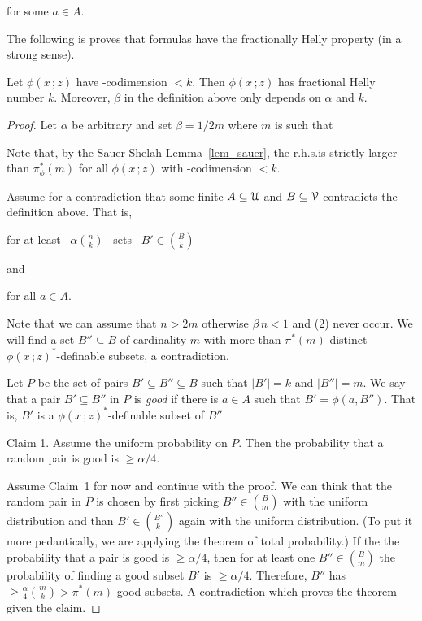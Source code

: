 \documentclass[scombinatorics.tex]{subfiles}
\begin{document}
\hfill for some $a\in A$.

The following is proves that \nip{} formulas have the fractionally Helly property (in a strong sense).

\begin{theorem}[(Matou\v{s}ek)]\label{thm_matousek}
Let  $\phi(x\,;z)$ have \vc-codimension $<k$.
Then $\phi(x\,;z)$ has fractional Helly number $k$.
Moreover, $\beta$ in the definition above only depends on $\alpha$ and $k$.
\end{theorem}

\begin{proof}
Let $\alpha$ be arbitrary and set $\beta=1/2m$ where $m$ is such that 


Note that, by the Sauer-Shelah Lemma~\ref{lem_sauer}, the r.h.s.\@ is strictly larger than $\pi^*_\phi(m)$ for all $\phi(x\,;z)$ with \vc-codimension $<k$.

Assume for a contradiction that some finite $A\subseteq\EuScript U$ and $B\subseteq\EuScript V$ contradicts the definition above.
That is,
 
\hfill for at least \ $\displaystyle\alpha{n\choose k}$ \ sets \ $\displaystyle B'\in{B\choose k}$

and

\hfill for all $a\in A$.

Note that we can assume that $n>2m$ otherwise $\beta\,n<1$ and (2) never occur.
We will find a set $B''\subseteq B$ of cardinality $m$ with more than $\pi^*(m)$ distinct $\phi(x\,;z)^*$-definable subsets, a contradiction.

Let $P$ be the set of pairs $B'\subseteq B''\subseteq B$ such that $|B'|=k$ and $|B''|=m$.
We say that a pair $B'\subseteq B''$ in $P$ is \textit{good\/} if there is $a\in A$ such that $B'=\phi(a,B'')$.
That is, $B'$ is a $\phi(x\,;z)^*$-definable subset of $B''$.

Claim 1. 
Assume the uniform probability on $P$.
Then the probability that a random pair is good is $\ge\alpha/4$.

Assume Claim~1 for now and continue with the proof.
We can think that the random pair in $P$ is chosen by first picking $B''\in{B\choose m}$ with the uniform distribution and than $B'\in{B''\choose k\phantom{'}}$ again with the uniform distribution. 
(To put it more pedantically, we are applying the theorem of total probability.)
If the the probability that a pair is good is $\ge\alpha/4$, then for at least one $B''\in{B\choose m}$ the probability of finding a good subset $B'$ is $\ge\alpha/4$.
Therefore, $B''$ has $\ge\frac\alpha4{m\choose k}>\pi^*(m)$ good subsets.
A contradiction which proves the theorem given the claim.


\end{proof}
\end{document}
